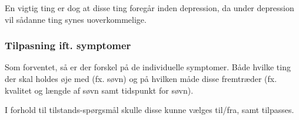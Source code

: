 En vigtig ting er dog at disse ting foregår inden depression, da under depression vil sådanne ting synes uoverkommelige.

\subsubsection{Tilpasning ift. symptomer}
Som forventet, så er der forskel på de individuelle symptomer.
Både hvilke ting der skal holdes øje med (fx. søvn) og på hvilken måde disse fremtræder (fx. kvalitet og længde af søvn samt tidspunkt for søvn).

I forhold til tilstands-spørgsmål skulle disse kunne vælges til/fra, samt tilpasses.
